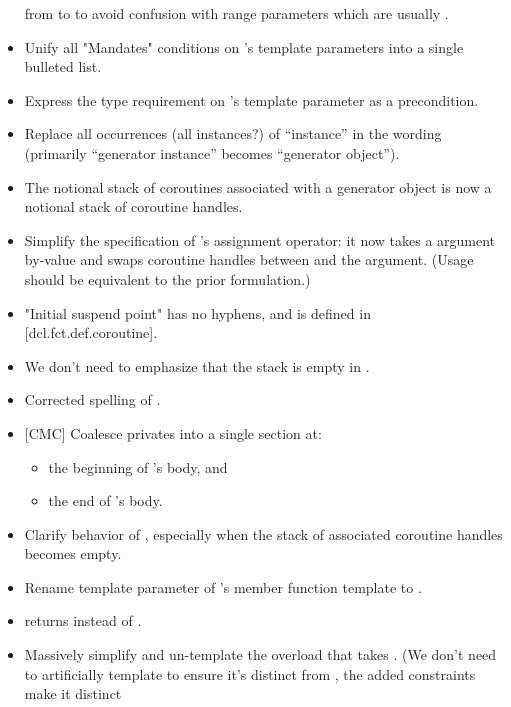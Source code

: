 \documentclass{wg21}
\begin{document}
\begin{itemize}
  from  to  to avoid confusion with range parameters which
  are usually .
\item Unify all "Mandates" conditions on 's template parameters
  into a single bulleted list.
\item Express the type requirement on 's 
  template parameter as a precondition.
\item Replace all occurrences (all instances?) of ``instance'' in the wording
  (primarily ``generator instance'' becomes ``generator object'').
\item The notional stack of coroutines
  associated with a generator object
  is now a notional stack of coroutine handles.
\item Simplify the specification of 's assignment operator:
  it now takes a  argument by-value and swaps coroutine handles
  between  and the argument. (Usage should be equivalent to the
  prior formulation.)
\item "Initial suspend point" has no hyphens, and
  is defined in [dcl.fct.def.coroutine].
\item We don't need to emphasize that the stack is empty in .
\item Corrected spelling of .
\item{} [CMC] Coalesce privates into a single section at:
  \begin{itemize}
    \item the beginning of 's body, and
    \item the end of 's body.
  \end{itemize}
\item Clarify behavior of , especially when
  the stack of associated coroutine handles becomes empty.
\item Rename template parameter  of 's
   member function template to .
\item {} returns  instead of
  .
\item Massively simplify and un-template the  overload that
  takes . (We don't need to
  artificially template to ensure it's distinct from
  , the added constraints make it distinct

\end{itemize}
\end{document}
